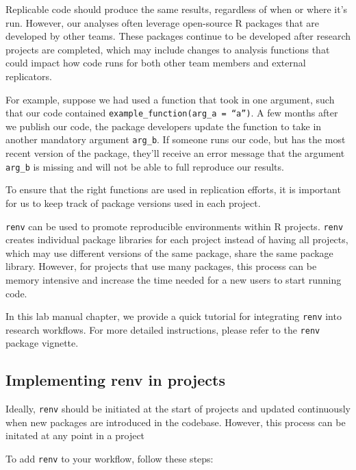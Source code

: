 \documentclass[
]{book}
\begin{document}
Replicable code should produce the same results, regardless of when or where it's run. However, our analyses often leverage open-source R packages that are developed by other teams. These packages continue to be developed after research projects are completed, which may include changes to analysis functions that could impact how code runs for both other team members and external replicators.

For example, suppose we had used a function that took in one argument, such that our code contained \texttt{example\_function(arg\_a\ =\ “a”)}. A few months after we publish our code, the package developers update the function to take in another mandatory argument \texttt{arg\_b}. If someone runs our code, but has the most recent version of the package, they'll receive an error message that the argument \texttt{arg\_b} is missing and will not be able to full reproduce our results.

To ensure that the right functions are used in replication efforts, it is important for us to keep track of package versions used in each project.

\texttt{renv} can be used to promote reproducible environments within R projects. \texttt{renv} creates individual package libraries for each project instead of having all projects, which may use different versions of the same package, share the same package library. However, for projects that use many packages, this process can be memory intensive and increase the time needed for a new users to start running code.

In this lab manual chapter, we provide a quick tutorial for integrating \texttt{renv} into research workflows. For more detailed instructions, please refer to the \texttt{renv} package vignette.

\subsection{Implementing renv in projects}\label{implementing-renv-in-projects}

Ideally, \texttt{renv} should be initiated at the start of projects and updated continuously when new packages are introduced in the codebase. However, this process can be initated at any point in a project

To add \texttt{renv} to your workflow, follow these steps:
\end{document}
